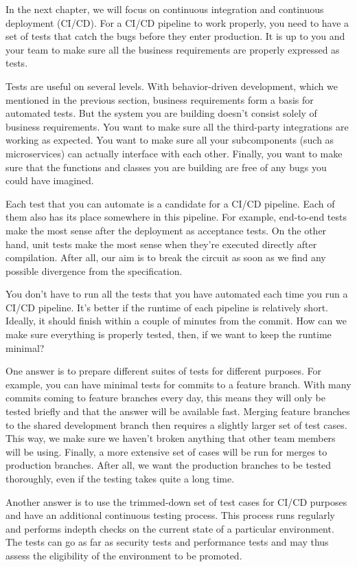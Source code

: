 
In the next chapter, we will focus on continuous integration and continuous deployment (CI/CD). For a CI/CD pipeline to work properly, you need to have a set of tests that catch the bugs before they enter production. It is up to you and your team to make sure all the business requirements are properly expressed as tests.

Tests are useful on several levels. With behavior-driven development, which we mentioned in the previous section, business requirements form a basis for automated tests. But the system you are building doesn't consist solely of business requirements. You want to make sure all the third-party integrations are working as expected. You want to make sure all your subcomponents (such as microservices) can actually interface with each other. Finally, you want to make sure that the functions and classes you are building are free of any bugs you could have imagined.

Each test that you can automate is a candidate for a CI/CD pipeline. Each of them also has its place somewhere in this pipeline. For example, end-to-end tests make the most sense after the deployment as acceptance tests. On the other hand, unit tests make the most sense when they're executed directly after compilation. After all, our aim is to break the circuit as soon as we find any possible divergence from the specification.

You don't have to run all the tests that you have automated each time you run a CI/CD pipeline. It's better if the runtime of each pipeline is relatively short. Ideally, it should finish within a couple of minutes from the commit. How can we make sure everything is properly tested, then, if we want to keep the runtime minimal?

One answer is to prepare different suites of tests for different purposes. For example, you can have minimal tests for commits to a feature branch. With many commits coming to feature branches every day, this means they will only be tested briefly and that the answer will be available fast. Merging feature branches to the shared development branch then requires a slightly larger set of test cases. This way, we make sure we haven't broken anything that other team members will be using. Finally, a more extensive set of cases will be run for merges to production branches. After all, we want the production branches to be tested thoroughly, even if the testing takes quite a long time.

Another answer is to use the trimmed-down set of test cases for CI/CD purposes and have an additional continuous testing process. This process runs regularly and performs indepth checks on the current state of a particular environment. The tests can go as far as security tests and performance tests and may thus assess the eligibility of the environment to be promoted.

